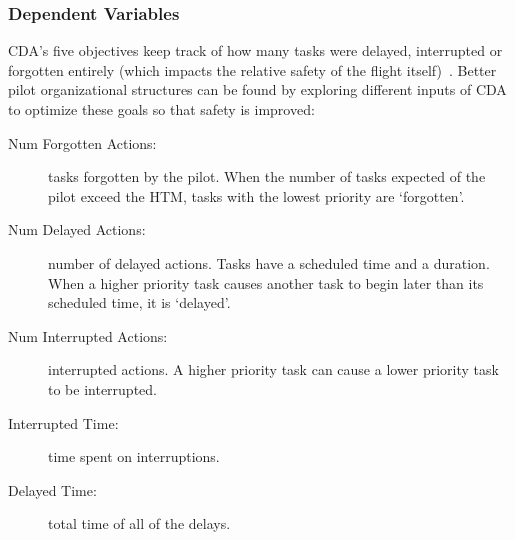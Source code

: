 \documentclass[journal]{IEEEtran}
\newcommand{\be}{\begin{enumerate}}
\newcommand{\ee}{\end{enumerate}}
\newenvironment{changed}{\par}{\par}
\begin{document}


\subsubsection{Dependent Variables}

CDA's five objectives  keep track of how many tasks were delayed, interrupted or forgotten entirely (which impacts the relative safety of the flight itself)~\cite{Kim2011}. 
Better pilot organizational structures can be found by exploring different inputs of CDA to optimize these goals so that safety is improved:
\begin{description}
\item[Num Forgotten Actions:] tasks forgotten by the pilot. When the number of tasks expected of the pilot exceed the HTM, tasks with the lowest priority are `forgotten'.
\item[Num Delayed Actions:] number of delayed actions. Tasks have a scheduled time and a duration.  When a higher priority task causes another task to begin later than its scheduled time, it is `delayed'.
\item[Num Interrupted Actions:] interrupted actions. A higher priority task can cause a lower priority task to be interrupted.
\item[Interrupted Time:] time spent on  interruptions.
\item[Delayed Time:] total time of all of the delays.
\end{description}
\end{document}
